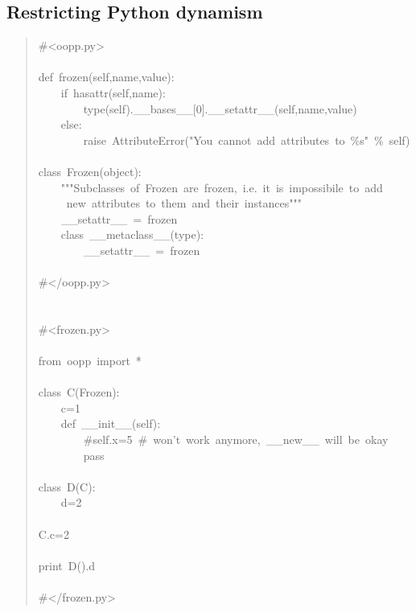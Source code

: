 \documentclass[10pt,english]{article}
\begin{document}

\hypertarget{restricting-python-dynamism}{}
\subsection*{Restricting Python dynamism}
\begin{quote}
\begin{ttfamily}\begin{flushleft}
\mbox{{\#}<oopp.py>}\\
\mbox{}\\
\mbox{def~frozen(self,name,value):}\\
\mbox{~~~~if~hasattr(self,name):}\\
\mbox{~~~~~~~~type(self).{\_}{\_}bases{\_}{\_}[0].{\_}{\_}setattr{\_}{\_}(self,name,value)~}\\
\mbox{~~~~else:}\\
\mbox{~~~~~~~~raise~AttributeError("You~cannot~add~attributes~to~{\%}s"~{\%}~self)}\\
\mbox{}\\
\mbox{class~Frozen(object):}\\
\mbox{~~~~"""Subclasses~of~Frozen~are~frozen,~i.e.~it~is~impossibile~to~add}\\
\mbox{~~~~~new~attributes~to~them~and~their~instances"""}\\
\mbox{~~~~{\_}{\_}setattr{\_}{\_}~=~frozen}\\
\mbox{~~~~class~{\_}{\_}metaclass{\_}{\_}(type):}\\
\mbox{~~~~~~~~{\_}{\_}setattr{\_}{\_}~=~frozen}\\
\mbox{}\\
\mbox{{\#}</oopp.py>}\\
\mbox{}\\
\mbox{}\\
\mbox{{\#}<frozen.py>}\\
\mbox{}\\
\mbox{from~oopp~import~*}\\
\mbox{}\\
\mbox{class~C(Frozen):}\\
\mbox{~~~~c=1}\\
\mbox{~~~~def~{\_}{\_}init{\_}{\_}(self):~}\\
\mbox{~~~~~~~~{\#}self.x=5~{\#}~won't~work~anymore,~{\_}{\_}new{\_}{\_}~will~be~okay}\\
\mbox{~~~~~~~~pass}\\
\mbox{}\\
\mbox{class~D(C):}\\
\mbox{~~~~d=2}\\
\mbox{~~}\\
\mbox{C.c=2}\\
\mbox{}\\
\mbox{print~D().d}\\
\mbox{}\\
\mbox{{\#}</frozen.py>}
\end{flushleft}\end{ttfamily}
\end{quote}
\end{document}

